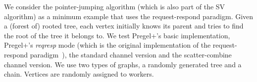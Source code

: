 \documentclass{sokendai_thesis} %
\newcommand{\PP}{Pregel+}
\begin{document}
We consider the pointer-jumping algorithm (which is also part of the SV algorithm) as a minimum example that uses the request-respond paradigm.
Given a (forest of) rooted tree, each vertex initially knows its parent and tries to find the root of the tree it belongs to.
We test \PP{}'s basic implementation, \PP{}'s \textit{reqresp} mode (which is the original implementation of the request-respond paradigm~\cite{yan2015effective}), the standard channel version and the scatter-combine channel version.
We use two types of graphs, a randomly generated tree and a chain.
Vertices are randomly assigned to workers.

\end{document}
